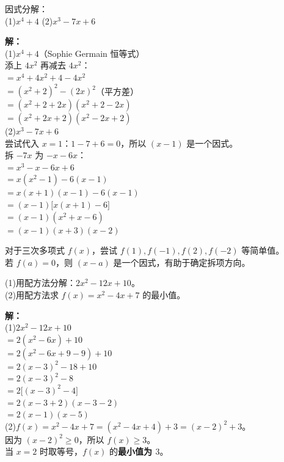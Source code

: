 \documentclass[12pt, a4paper]{ctexart}
\begin{document}
\begin{examplebox}[【例题 5】拆项添项法]
因式分解：\\[3pt]
(1)\;$x^4 + 4$ \qquad (2)\;$x^3 - 7x + 6$
\end{examplebox}

\textbf{解：}\\[3pt]
(1)\;$x^4 + 4$（Sophie Germain 恒等式）\\
添上 $4x^2$ 再减去 $4x^2$：\\
$= x^4 + 4x^2 + 4 - 4x^2$\\
$= (x^2 + 2)^2 - (2x)^2$\quad（平方差）\\
$= (x^2 + 2 + 2x)(x^2 + 2 - 2x)$\\
$= (x^2 + 2x + 2)(x^2 - 2x + 2)$\\[6pt]
(2)\;$x^3 - 7x + 6$\\
尝试代入 $x=1$：$1 - 7 + 6 = 0$，所以 $(x-1)$ 是一个因式。\\[3pt]
拆 $-7x$ 为 $-x - 6x$：\\
$= x^3 - x - 6x + 6$\\
$= x(x^2-1) - 6(x-1)$\\
$= x(x+1)(x-1) - 6(x-1)$\\
$= (x-1)\big[x(x+1) - 6\big]$\\
$= (x-1)(x^2+x-6)$\\
$= (x-1)(x+3)(x-2)$

\begin{tipbox}[技巧：试根法辅助拆项]
对于三次多项式 $f(x)$，尝试 $f(1), f(-1), f(2), f(-2)$ 等简单值。\\
若 $f(a)=0$，则 $(x-a)$ 是一个因式，有助于确定拆项方向。
\end{tipbox}

\begin{examplebox}[【例题 6】配方法求最值]
(1)\quad 用配方法分解：$2x^2 - 12x + 10$。\\[3pt]
(2)\quad 用配方法求 $f(x) = x^2 - 4x + 7$ 的最小值。
\end{examplebox}

\textbf{解：}\\[3pt]
(1)\;$2x^2 - 12x + 10$\\
$= 2(x^2 - 6x) + 10$\\
$= 2(x^2 - 6x + 9 - 9) + 10$\\
$= 2(x-3)^2 - 18 + 10$\\
$= 2(x-3)^2 - 8$\\
$= 2\big[(x-3)^2 - 4\big]$\\
$= 2(x-3+2)(x-3-2)$\\
$= 2(x-1)(x-5)$\\[6pt]
(2)\;$f(x) = x^2 - 4x + 7 = (x^2-4x+4) + 3 = (x-2)^2 + 3$。\\
因为 $(x-2)^2 \geqslant 0$，所以 $f(x) \geqslant 3$。\\
当 $x=2$ 时取等号，$f(x)$ 的\textbf{最小值为 $3$}。
\end{document}
